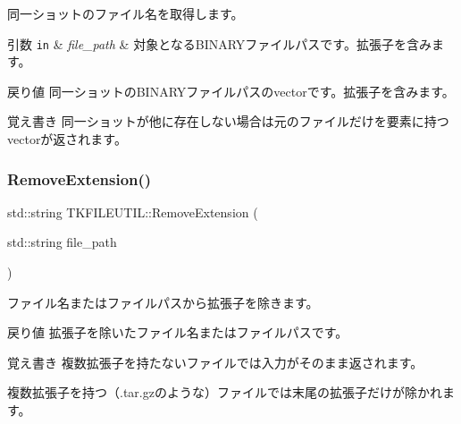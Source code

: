 同一ショットのファイル名を取得します。 
\begin{DoxyParams}[1]{引数}
\mbox{\tt in}  & {\em file\+\_\+path} & 対象となる\+B\+I\+N\+A\+R\+Yファイルパスです。拡張子を含みます。 \\
\hline
\end{DoxyParams}
\begin{DoxyReturn}{戻り値}
同一ショットの\+B\+I\+N\+A\+R\+Yファイルパスのvectorです。拡張子を含みます。 
\end{DoxyReturn}
\begin{DoxyNote}{覚え書き}
同一ショットが他に存在しない場合は元のファイルだけを要素に持つvectorが返されます。 
\end{DoxyNote}
\mbox{\label{namespace_t_k_f_i_l_e_u_t_i_l_ae7b4e47d9221322ea5dbaaaefd83b2b6}} 
\subsubsection{\texorpdfstring{Remove\+Extension()}{RemoveExtension()}}
{\footnotesize\ttfamily std\+::string T\+K\+F\+I\+L\+E\+U\+T\+I\+L\+::\+Remove\+Extension (\begin{DoxyParamCaption}\item[{std\+::string}]{file\+\_\+path }\end{DoxyParamCaption})}

ファイル名またはファイルパスから拡張子を除きます。 \begin{DoxyReturn}{戻り値}
拡張子を除いたファイル名またはファイルパスです。 
\end{DoxyReturn}
\begin{DoxyNote}{覚え書き}
複数拡張子を持たないファイルでは入力がそのまま返されます。 

複数拡張子を持つ（.\+tar.\+gzのような）ファイルでは末尾の拡張子だけが除かれます。 
\end{DoxyNote}
